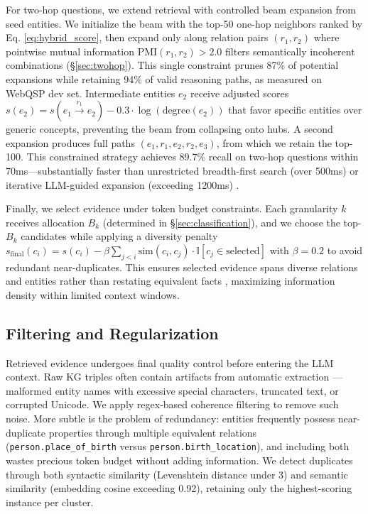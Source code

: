 \documentclass[conference]{IEEEtran}
\begin{document}
For two-hop questions, we extend retrieval with controlled beam expansion from seed entities. We initialize the beam with the top-50 one-hop neighbors ranked by Eq. \ref{eq:hybrid_score}, then expand only along relation pairs $(r_1, r_2)$ where pointwise mutual information $\text{PMI}(r_1, r_2) > 2.0$ filters semantically incoherent combinations (§\ref{sec:twohop}). This single constraint prunes 87\% of potential expansions while retaining 94\% of valid reasoning paths, as measured on WebQSP dev set. Intermediate entities $e_2$ receive adjusted scores $s(e_2) = s(e_1 \xrightarrow{r_1} e_2) - 0.3 \cdot \log(\text{degree}(e_2))$ that favor specific entities over generic concepts, preventing the beam from collapsing onto hubs. A second expansion produces full paths $(e_1, r_1, e_2, r_2, e_3)$, from which we retain the top-100. This constrained strategy achieves 89.7\% recall on two-hop questions within 70ms—substantially faster than unrestricted breadth-first search (over 500ms) or iterative LLM-guided expansion (exceeding 1200ms) \cite{sun2023think,jiang2024kg}.

Finally, we select evidence under token budget constraints. Each granularity $k$ receives allocation $B_k$ (determined in §\ref{sec:classification}), and we choose the top-$B_k$ candidates while applying a diversity penalty $s_{\text{final}}(c_i) = s(c_i) - \beta \sum_{j < i} \text{sim}(c_i, c_j) \cdot \mathbb{I}[c_j \in \text{selected}]$ with $\beta=0.2$ to avoid redundant near-duplicates. This ensures selected evidence spans diverse relations and entities rather than restating equivalent facts \cite{xiong2021answering}, maximizing information density within limited context windows.

\subsection{Filtering and Regularization}
\label{sec:filtering}

Retrieved evidence undergoes final quality control before entering the LLM context. Raw KG triples often contain artifacts from automatic extraction \cite{bollacker2008freebase}—malformed entity names with excessive special characters, truncated text, or corrupted Unicode. We apply regex-based coherence filtering to remove such noise. More subtle is the problem of redundancy: entities frequently possess near-duplicate properties through multiple equivalent relations (\texttt{person.place\_of\_birth} versus \texttt{person.birth\_location}), and including both wastes precious token budget without adding information. We detect duplicates through both syntactic similarity (Levenshtein distance under 3) and semantic similarity (embedding cosine exceeding 0.92), retaining only the highest-scoring instance per cluster.
\end{document}
